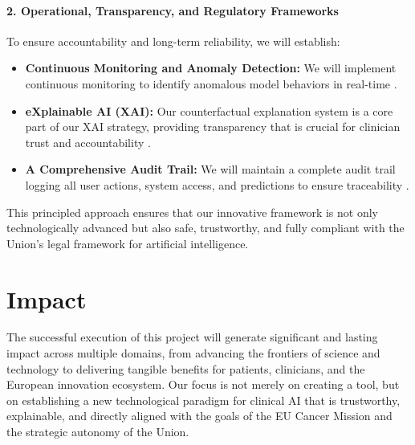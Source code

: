 \documentclass[11pt, a4paper]{article}
\begin{document}
\begin{itemize}
\paragraph{2. Operational, Transparency, and Regulatory Frameworks}
To ensure accountability and long-term reliability, we will establish:
\begin{itemize}
    \item \textbf{Continuous Monitoring and Anomaly Detection:} We will implement continuous monitoring to identify anomalous model behaviors in real-time \cite{AlAttar2023,GarcaGmezBlanesSelva2023}.
    \item \textbf{eXplainable AI (XAI):} Our counterfactual explanation system is a core part of our XAI strategy, providing transparency that is crucial for clinician trust and accountability \cite{GarcaGmezBlanesSelva2023,JamesIjiga2024}.
    \item \textbf{A Comprehensive Audit Trail:} We will maintain a complete audit trail logging all user actions, system access, and predictions to ensure traceability \cite{GarcaGmezBlanesSelva2023,KhadkaEpiphaniou2025}.
\end{itemize}
\end{itemize}

This principled approach ensures that our innovative framework is not only technologically advanced but also safe, trustworthy, and fully compliant with the Union's legal framework for artificial intelligence.

\section{Impact}
The successful execution of this project will generate significant and lasting impact across multiple domains, from advancing the frontiers of science and technology to delivering tangible benefits for patients, clinicians, and the European innovation ecosystem. Our focus is not merely on creating a tool, but on establishing a new technological paradigm for clinical AI that is trustworthy, explainable, and directly aligned with the goals of the EU Cancer Mission and the strategic autonomy of the Union.
\end{document}
